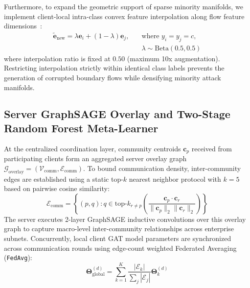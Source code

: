\documentclass[12pt,a4paper]{report}
\begin{document}
Furthermore, to expand the geometric support of sparse minority manifolds, we implement client-local intra-class convex feature interpolation along flow feature dimensions~\cite{zhang2018mixup}:
\begin{equation}
\begin{split}
\tilde{\boldsymbol{e}}_{\text{new}} = \lambda \boldsymbol{e}_i + (1 - \lambda) \boldsymbol{e}_j, \quad & \text{where } y_i = y_j = c, \\
& \lambda \sim \text{Beta}(0.5, 0.5)
\end{split}
\label{eq:convex_interpolation}
\end{equation}
where interpolation ratio is fixed at $0.50$ (maximum 10x augmentation). Restricting interpolation strictly within identical class labels prevents the generation of corrupted boundary flows while densifying minority attack manifolds.

\subsection{Server GraphSAGE Overlay and Two-Stage Random Forest Meta-Learner}
At the centralized coordination layer, community centroids $\boldsymbol{c}_p$ received from participating clients form an aggregated server overlay graph $\mathcal{G}_{\text{overlay}} = (\mathcal{V}_{\text{comm}}, \mathcal{E}_{\text{comm}})$. To bound communication density, inter-community edges are established using a static top-$k$ nearest neighbor protocol with $k = 5$ based on pairwise cosine similarity:
\begin{equation}
\mathcal{E}_{\text{comm}} = \left\{ (p, q) : q \in \text{top-}k_{r \neq p}\left( \frac{\boldsymbol{c}_p \cdot \boldsymbol{c}_r}{\|\boldsymbol{c}_p\|_2 \|\boldsymbol{c}_r\|_2} \right) \right\}
\label{eq:topk_edges}
\end{equation}
The server executes 2-layer GraphSAGE inductive convolutions over this overlay graph to capture macro-level inter-community relationships across enterprise subnets. Concurrently, local client GAT model parameters are synchronized across communication rounds using edge-count weighted Federated Averaging (\texttt{FedAvg}):
\begin{equation}
\boldsymbol{\Theta}_{\text{global}}^{(d)} = \sum_{k=1}^K \frac{|\mathcal{E}_k|}{\sum_{j} |\mathcal{E}_j|} \boldsymbol{\Theta}_k^{(d)}
\label{eq:fedavg_rounds}
\end{equation}
\end{document}
